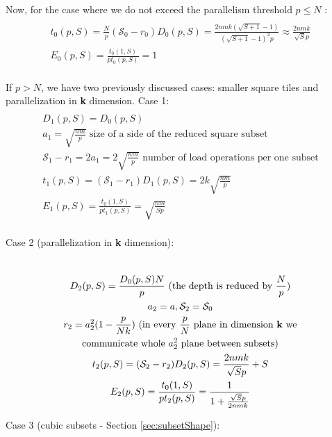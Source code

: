 \documentclass[sigplan,review,anonymous]{acmart}\settopmatter{printfolios=true,printccs=false,printacmref=false}
\begin{document}
Now, for the case where we do not exceed the parallelism threshold $p \le N$ : 
\begin{multline}
\\
t_0(p,S) = \frac{N}{p} (\mathcal{S}_0 - r_0) D_0(p,S) = \frac{2nmk(\sqrt{S+1} 
	- 
	1)}{(\sqrt{S+1} - 1)^2 p} \approx \frac{2nmk}{\sqrt{S} p} \\
E_0(p,S) = \frac{t_0(1,S)}{p t_0(p,S)} = 1 \\
\end{multline}

If $p > N$, we have two previously discussed cases: smaller square tiles and 
parallelization in \textbf{k} dimension. Case 1:
\begin{multline}
\\
D_1(p,S) = D_0(p,S) \\
a_1 = \sqrt{\frac{nm}{p}} \text{ size of a side of the reduced square 
	subset} \\
\mathcal{S}_1 - r_1 = 2a_1 = 2\sqrt{\frac{nm}{p}} \text{ number of load 
	operations per one subset} \\
t_1(p,S) = (\mathcal{S}_1 - r_1) D_1(p,S) = 2k \sqrt{\frac{nm}{p}} \\
E_1(p,S) = \frac{t_0(1,S)}{p t_1(p,S)} = \sqrt{\frac{nm}{Sp}} \\
\end{multline}

Case 2 (parallelization in \textbf{k} dimension): 

\begin{multline}
\\
D_2(p,S) = \frac{D_0(p,S)N}{p} \text{ (the depth is reduced by } \frac{N}{p} 
\text{)}\\
a_2 = a , \mathcal{S}_2 = \mathcal{S}_0\\ 
r_2 = a_2^2(1 - \frac{p}{Nk}) \text{ (in every $\frac{p}{N}$ plane in dimension 
	\textbf{k} we} \\
\text{communicate whole $a_2^2$ plane between subsets)} \\
t_2(p,S) = (\mathcal{S}_2 - r_2) D_2(p,S) = \frac{2nmk}{\sqrt{S}p} + S \\
E_2(p,S) = \frac{t_0(1,S)}{p t_2(p,S)} = \frac{1}{1 + \frac{\sqrt{S}p}{2nmk}} \\
\end{multline}

Case 3 (cubic subsets - Section \ref{sec:subsetShape}):
\end{document}
